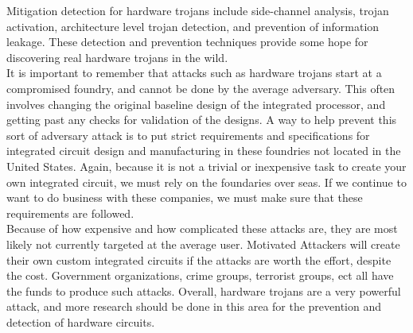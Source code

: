 \documentclass[letterpaper,twocolumn,11pt]{article}
\begin{document}
Mitigation detection for hardware trojans include side-channel analysis, trojan activation, architecture level trojan detection, and prevention of information leakage. These detection and prevention techniques provide some hope for discovering real hardware trojans in the wild. \\

It is important to remember that attacks such as hardware trojans start at a compromised foundry, and cannot be done by the average adversary. This often involves changing the original baseline design of the integrated processor, and getting past any checks for validation of the designs. A way to help prevent this sort of adversary attack is to put strict requirements and specifications for integrated circuit design and manufacturing in these foundries not located in the United States. Again, because it is not a trivial or inexpensive task to create your own integrated circuit, we must rely on the foundaries over seas. If we continue to want to do business with these companies, we must make sure that these requirements are followed. \\

Because of how expensive and how complicated these attacks are, they are most likely not currently targeted at the average user. Motivated Attackers will create their own custom integrated circuits if the attacks are worth the effort, despite the cost. Government organizations, crime groups, terrorist groups, ect all have the funds to produce such attacks. Overall, hardware trojans are a very powerful attack, and more research should be done in this area for the prevention and detection of hardware circuits. \\
\end{document}
